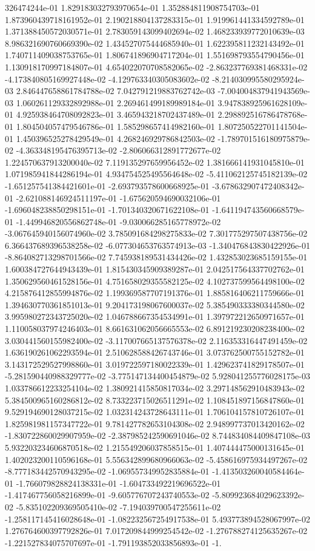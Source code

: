 326474244e-01	1.829183032793970654e-01	1.352884811908754703e-01	1.873960439718161952e-01	2.190218804137283315e-01	1.919961441334592789e-01	1.371388450572030571e-01	2.783059143099402694e-02	1.468233939772010639e-03	8.986321690760669390e-02	1.434527075444685940e-01	1.622395811232143492e-01	1.740711409038753765e-01	1.806741896904717204e-01	1.551698793554790456e-01	1.130918170997184807e-01	4.654022070708582065e-02	-2.863237769381468331e-02	-4.173840805169927448e-02	-4.129763340305083602e-02	-8.214030995580295924e-03	2.846447658861784788e-02	7.042791219883762742e-03	-7.004004837941943569e-03	1.060261129332892988e-01	2.269461499189989184e-01	3.947838925961628109e-01	4.925938464708092823e-01	3.465943218702437489e-01	2.298892516786478768e-01	1.804504057479546786e-01	1.585298657414982160e-01	1.807250522701141504e-01	1.450396525278429549e-01	4.268246929786842503e-02	-1.789701516180975879e-02	-4.363348195476395713e-02	-2.806066312891772677e-02	1.224570637913200040e-02	7.119135297659956452e-02	1.381666141931045810e-01	1.071985941844286194e-01	4.934754525495564648e-02	-5.411062125745182139e-02	-1.651257541384421601e-01	-2.693793578600668925e-01	-3.678632907472408342e-01	-2.621088146924511197e-01	-1.675620594690032106e-01	-1.696048238850298151e-01	-1.701340320671622108e-01	-1.641194743560668579e-01	-1.449946820556862748e-01	-9.030066285165778972e-02	-3.067645940156074960e-02	3.785091684298275833e-02	7.301775297507438756e-02	6.366437689396538258e-02	-6.077304653763574913e-03	-1.340476843830422926e-01	-8.864082713298701566e-02	7.745938189531434426e-02	1.432853023685159155e-01	1.600384727644943439e-01	1.815430345909389287e-01	2.042517564337702762e-01	1.350629560461528156e-01	4.751658029355582125e-02	4.102737599564498100e-02	4.215876412855994876e-02	1.199369587707191376e-01	1.885816406211759666e-01	1.394630770361851013e-01	9.204173198067600037e-02	5.385490333380344580e-02	3.995980272343725020e-02	1.046788667354534991e-01	1.397972212650971657e-01	1.110058037974246403e-01	8.661631062056665553e-02	6.891219230208238400e-02	3.030441560155982400e-02	-3.117007665137576378e-02	2.116353316447491459e-02	1.636190261062293594e-01	2.510628588426743746e-01	3.073762500755152782e-01	3.143172529527998860e-01	3.019722597180022339e-01	1.429623741829178507e-01	-5.281590440988329777e-02	-3.775147134400454879e-02	5.928041255776028175e-03	1.033786612233254104e-02	1.380921415850817034e-02	3.297148562910483943e-02	5.384500965160286812e-02	8.733223715026511291e-02	1.108451897156847860e-01	9.529194690128037215e-02	1.032314243728643111e-01	1.706104157810726107e-01	1.825981981157347722e-01	9.781427782653104308e-02	2.948997737013420162e-02	-1.830722860029907959e-02	-2.387985242590691046e-02	8.744834084409847108e-03	5.932203234606870518e-02	1.215549206037858515e-01	1.407444475000131645e-01	1.402023200110596168e-01	5.556342899680966063e-02	-5.458616975934497267e-02	-8.777183442570943295e-02	-1.069557349952835884e-01	-1.413503260040584464e-01	-1.766079828824138331e-01	-1.604733492219696522e-01	-1.417467756058216899e-01	-9.605776707243740553e-02	-5.809923684029623392e-02	-5.835102209369505410e-02	-7.194039700547255611e-02	-1.258117145416028648e-01	-1.082232567254917538e-01	5.493773894528067997e-02	1.276764600397792826e-01	7.017209844999254542e-02	-1.276788274125635267e-02	-1.221527834075707697e-01	-1.791193852033856893e-01	-1.
